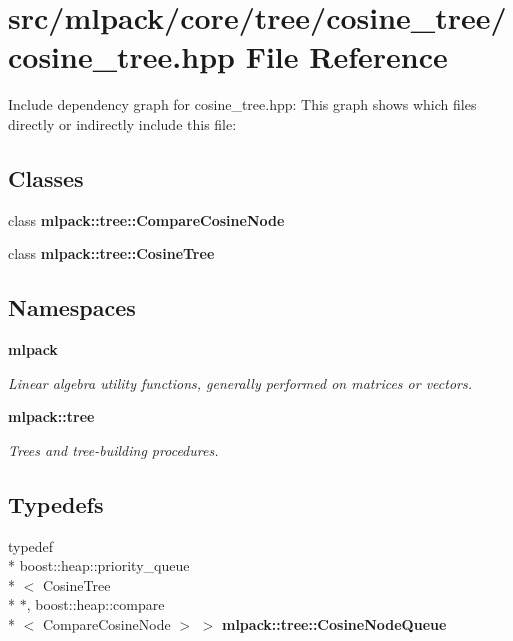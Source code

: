\section{src/mlpack/core/tree/cosine\-\_\-tree/cosine\-\_\-tree.hpp File Reference}
\label{cosine__tree_8hpp}
Include dependency graph for cosine\-\_\-tree.\-hpp\-:
This graph shows which files directly or indirectly include this file\-:
\subsection*{Classes}
\begin{DoxyCompactItemize}
\item 
class {\bf mlpack\-::tree\-::\-Compare\-Cosine\-Node}
\item 
class {\bf mlpack\-::tree\-::\-Cosine\-Tree}
\end{DoxyCompactItemize}
\subsection*{Namespaces}
\begin{DoxyCompactItemize}
\item 
{\bf mlpack}
\begin{DoxyCompactList}\small\item\em Linear algebra utility functions, generally performed on matrices or vectors. \end{DoxyCompactList}\item 
{\bf mlpack\-::tree}
\begin{DoxyCompactList}\small\item\em Trees and tree-\/building procedures. \end{DoxyCompactList}\end{DoxyCompactItemize}
\subsection*{Typedefs}
\begin{DoxyCompactItemize}
\item 
typedef \\*
boost\-::heap\-::priority\-\_\-queue\\*
$<$ Cosine\-Tree \\*
$\ast$, boost\-::heap\-::compare\\*
$<$ Compare\-Cosine\-Node $>$ $>$ {\bf mlpack\-::tree\-::\-Cosine\-Node\-Queue}
\end{DoxyCompactItemize}


